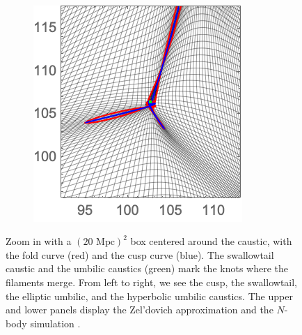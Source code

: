 \documentclass[a4paper, 11pt]{article}
\begin{document}
\begin{figure}
\begin{subfigure}[b]{0.24\textwidth}
\end{subfigure}~
\begin{subfigure}[b]{0.24\textwidth}
\includegraphics[width=\textwidth]{Hyperbolic_Nb_Zoom}
\end{subfigure}
\caption{Zoom in with a $(20 \text{ Mpc})^2$ box centered around the caustic, with the fold curve (red) and the cusp curve (blue). The swallowtail caustic and the umbilic caustics (green) mark the knots where the filaments merge. From left to right, we see the cusp, the swallowtail, the elliptic umbilic, and the hyperbolic umbilic caustics. The upper and lower panels display the Zel'dovich approximation and the $N$-body simulation \cite{Hidding:2020}.}\label{fig:caustics_Examples_Small}
\end{figure}
\end{document}
